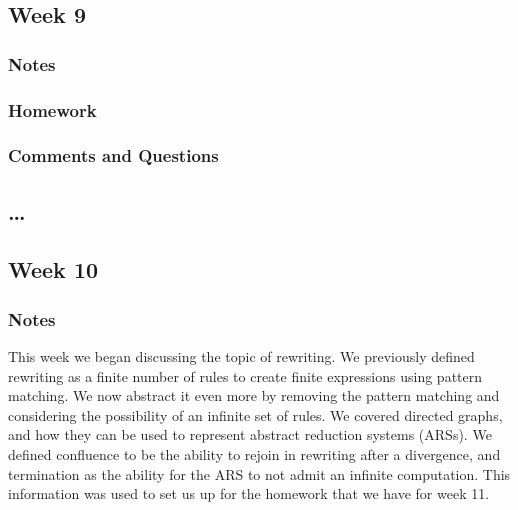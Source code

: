 \documentclass{article}
\theoremstyle{theorem}
\theoremstyle{definition}
\theoremstyle{remark}
\begin{document}
\subsection{Week 9}
\subsubsection*{Notes}


\subsubsection*{Homework}

\subsubsection*{Comments and Questions}

\subsection{\ldots}

\subsection{Week 10}
\subsubsection*{Notes}
This week we began discussing the topic of rewriting. We previously defined rewriting as a finite number of 
rules to create finite expressions using pattern matching. We now abstract it even more by removing the 
pattern matching and considering the possibility of an infinite set of rules. We covered directed graphs,
and how they can be used to represent abstract reduction systems (ARSs). We defined confluence to be the ability
to rejoin in rewriting after a divergence, and termination as the ability for the ARS to not admit an infinite
computation. This information was used to set us up for the homework that we have for week 11. 
\end{document}
